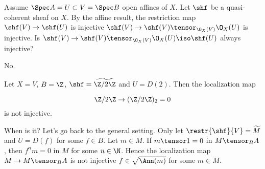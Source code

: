 \begin{question}
Assume $\Spec A = U \subset V = \Spec B$ open affines of $X$.
Let $\shf$ be a quasi-coherent sheaf on $X$.
By the affine result, the restriction map $\shf(V) \rightarrow \shf(U)$ is injective \iff $\shf(V) \rightarrow \shf(V)\tensor_{\O_X(V)}\O_X(U)$ is injective.
Is $\shf(V) \rightarrow \shf(V)\tensor_{\O_X(V)} \O_X(U) \iso \shf(U)$ always injective?
\end{question}
\begin{Qanswer}
No.

Let $X=V$, $B= \Z$, $\shf= \widetilde{\Z/2\Z}$ and $U= D(2)$.
Then the localization map 

\[ \Z/2\Z \rightarrow (\Z/2\Z)_2 = 0\]
is not injective. 

\bigskip
When is it?
Let's go back to the general setting. 
Only let $\restr{\shf}{V}= \widetilde{M}$ and $U= D(f)$ for some $f \in B$.
Let $m\in M$. If $m \tensor 1 = 0$ in $M\tensor_B A$, then $f^n m = 0$ in $M$ for some $n\in \N$.
Hence the localization map $M\rightarrow M\tensor_B A$ is not injective \iff $f\in \sqrt{\Ann(m)}$ for some $m\in M$.
\end{Qanswer}